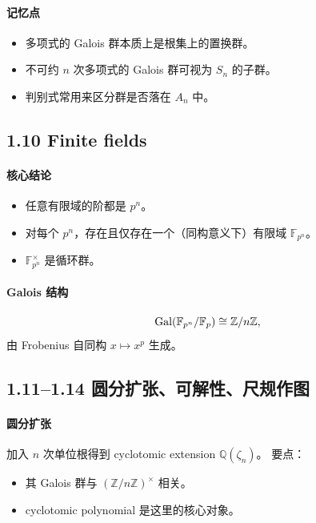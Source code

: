 \documentclass[a4paper]{ctexart}
\begin{document}
\paragraph{记忆点}
\begin{itemize}
  \item 多项式的 Galois 群本质上是根集上的置换群。
  \item 不可约 \(n\) 次多项式的 Galois 群可视为 \(S_n\) 的子群。
  \item 判别式常用来区分群是否落在 \(A_n\) 中。
\end{itemize}

\subsection{1.10 Finite fields}

\paragraph{核心结论}
\begin{itemize}
  \item 任意有限域的阶都是 \(p^n\)。
  \item 对每个 \(p^n\)，存在且仅存在一个（同构意义下）有限域 \(\mathbb F_{p^n}\)。
  \item \(\mathbb F_{p^n}^\times\) 是循环群。
\end{itemize}

\paragraph{Galois 结构}
\[
{\rm Gal}(\mathbb F_{p^n}/\mathbb F_p)
\cong
\mathbb Z/n\mathbb Z,
\]
由 Frobenius 自同构 \(x\mapsto x^p\) 生成。

\subsection{1.11--1.14 圆分扩张、可解性、尺规作图}

\paragraph{圆分扩张}
加入 \(n\) 次单位根得到 cyclotomic extension \( \mathbb Q(\zeta_n)\)。
要点：
\begin{itemize}
  \item 其 Galois 群与 \((\mathbb Z/n\mathbb Z)^\times\) 相关。
  \item cyclotomic polynomial 是这里的核心对象。
\end{itemize}
\end{document}
